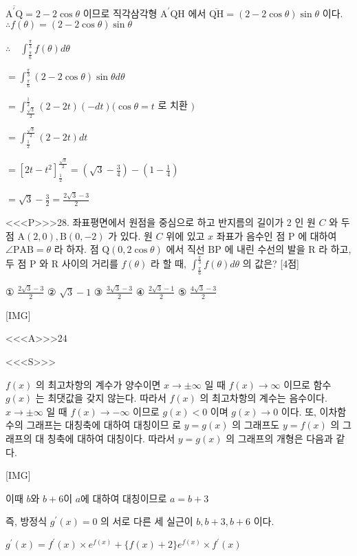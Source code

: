 \documentclass{oblivoir}
\begin{document}
$\overline{\mathrm{A}^{\prime} \mathrm{Q}}=2-2 \cos \theta$ 이므로
직각삼각형 $\mathrm{A}^{\prime} \mathrm{QH}$ 에서
$\overline{\mathrm{QH}}=(2-2 \cos \theta) \sin \theta$ 이다.
$\therefore f(\theta)=(2-2 \cos \theta) \sin \theta$

$\therefore \quad \int_{\frac{\pi}{6}}^{\frac{\pi}{3}} f(\theta) d \theta$

$=\int_{\frac{\pi}{6}}^{\frac{\pi}{3}}(2-2 \cos \theta) \sin \theta d \theta$

$=\int_{\frac{\sqrt{3}}{2}}^{\frac{1}{2}}(2-2 t)(-d t)(\cos \theta=t$ 로 치환 $)$

$=\int_{\frac{1}{2}}^{\frac{\sqrt{3}}{2}}(2-2 t) d t$

$=\left[2 t-t^{2}\right]_{\frac{1}{2}}^{\frac{\sqrt{3}}{2}}=\left(\sqrt{3}-\frac{3}{4}\right)-\left(1-\frac{1}{4}\right)$

$=\sqrt{3}-\frac{3}{2}=\frac{2 \sqrt{3}-3}{2}$


<<<P>>>28. 좌표평면에서 원점을 중심으로 하고 반지름의 길이가 2 인 원 $C$ 와 두 점 $\mathrm{A}(2,0), \mathrm{B}(0,-2)$ 가 있다. 원 $C$ 위에 있고 $x$ 좌표가 음수인 점 $\mathrm{P}$ 에 대하여 $\angle \mathrm{PAB}=\theta$ 라 하자.
점 $\mathrm{Q}(0,2 \cos \theta)$ 에서 직선 $\mathrm{BP}$ 에 내린 수선의 발을 $\mathrm{R}$ 라 하고, 두 점 $\mathrm{P}$ 와 $\mathrm{R}$ 사이의 거리를 $f(\theta)$ 라 할 때, $\int_{\frac{\pi}{6}}^{\frac{\pi}{3}} f(\theta) d \theta$ 의 값은? [4점]

① $\frac{2 \sqrt{3}-3}{2}$
② $\sqrt{3}-1$
③ $\frac{3 \sqrt{3}-3}{2}$
④ $\frac{2 \sqrt{3}-1}{2}$
⑤ $\frac{4 \sqrt{3}-3}{2}$


[IMG]


<<<A>>>$24$

<<<S>>>



$f(x)$ 의 최고차항의 계수가 양수이면 $x \rightarrow \pm \infty$ 일 때 $f(x) \rightarrow \infty$ 이므로 함수 $g(x)$ 는 최댓값을 갖지 않는다.
따라서 $f(x)$ 의 최고차항의 계수는 음수이다. $x \rightarrow \pm \infty$ 일 때 $f(x) \rightarrow-\infty$ 이므로 $g(x)<0$ 이며 $g(x) \rightarrow 0$ 이다.
또, 이차함수의 그래프는 대칭축에 대하여 대칭이므 로 $y=g(x)$ 의 그래프도 $y=f(x)$ 의 그래프의 대 칭축에 대하여 대칭이다.
따라서 $y=g(x)$ 의 그래프의 개형은 다음과 같다.

[IMG]

이때 $b$와 $b+6$이 $a$에 대하여 대칭이므로 $a=b+3$ 

즉, 방정식 $g^{\prime}(x)=0$ 의 서로 다른 세 실근이 $b, b+3, b+6$ 이다.

$g^{\prime}(x)=f^{\prime}(x) \times e^{f(x)}+\{f(x)+2\} e^{f(x)} \times f^{\prime}(x)$
\end{document}
